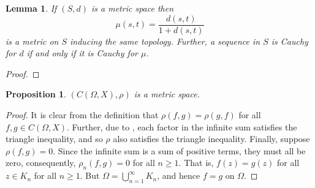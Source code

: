 \documentclass[11pt]{article}
\theoremstyle{thmstyle}
\newtheorem{lemma}[theorem]{Lemma}
\newtheorem{proposition}[theorem]{Proposition}
\theoremstyle{defstyle}
\renewcommand{\ge}{\geqslant}
\begin{document}
\begin{lemma}
    If $(S, d)$ is a metric space then 
    \begin{equation*}
        \mu(s, t) = \frac{d(s, t)}{1 + d(s, t)}
    \end{equation*}
    is a metric on $S$ inducing the same topology. Further, a sequence in $S$ is Cauchy for $d$ if and only if it is Cauchy for $\mu$.
\end{lemma}
\begin{proof}
\end{proof}

\begin{proposition}
    $\left(C(\Omega, X), \rho\right)$ is a metric space. 
\end{proposition}
\begin{proof}
    It is clear from the definition that $\rho(f, g) = \rho(g, f)$ for all $f,g\in C(\Omega, X)$. Further, due to , each factor in the infinite sum satisfies the triangle inequality, and so $\rho$ also satisfies the triangle inequality. Finally, suppose $\rho(f, g) = 0$. Since the infinite sum is a sum of positive terms, they must all be zero, consequently, $\rho_n(f, g) = 0$ for all $n\ge 1$. That is, $f(z) = g(z)$ for all $z\in K_n$ for all $n\ge 1$. But $\Omega = \displaystyle\bigcup_{n = 1}^\infty K_n$, and hence $f = g$ on $\Omega$.
\end{proof}
\end{document}
